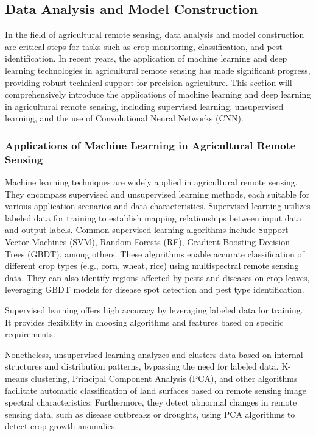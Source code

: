 \subsection{Data Analysis and Model Construction}

In the field of agricultural remote sensing, data analysis and model construction are critical steps for tasks such as crop monitoring, classification, and pest identification. In recent years, the application of machine learning and deep learning technologies in agricultural remote sensing has made significant progress, providing robust technical support for precision agriculture. This section will comprehensively introduce the applications of machine learning and deep learning in agricultural remote sensing, including supervised learning, unsupervised learning, and the use of Convolutional Neural Networks (CNN).

\subsubsection{Applications of Machine Learning in Agricultural Remote Sensing}

Machine learning techniques are widely applied in agricultural remote sensing. They encompass supervised and unsupervised learning methods, each suitable for various application scenarios and data characteristics\cite{weissRemoteSensingAgricultural2020}. Supervised learning utilizes labeled data for training to establish mapping relationships between input data and output labels. Common supervised learning algorithms include Support Vector Machines (SVM), Random Forests (RF), Gradient Boosting Decision Trees (GBDT), among others. These algorithms enable accurate classification of different crop types (e.g., corn, wheat, rice) using multispectral remote sensing data. They can also identify regions affected by pests and diseases on crop leaves, leveraging GBDT models for disease spot detection and pest type identification.

Supervised learning offers high accuracy by leveraging labeled data for training. It provides flexibility in choosing algorithms and features based on specific requirements. 

Nonetheless, unsupervised learning analyzes and clusters data based on internal structures and distribution patterns, bypassing the need for labeled data. K-means clustering, Principal Component Analysis (PCA), and other algorithms facilitate automatic classification of land surfaces based on remote sensing image spectral characteristics. Furthermore, they detect abnormal changes in remote sensing data, such as disease outbreaks or droughts, using PCA algorithms to detect crop growth anomalies.

